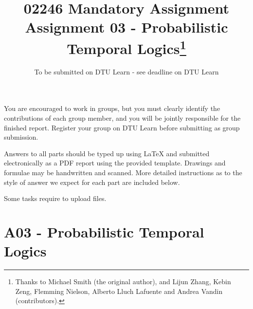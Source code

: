 \documentclass[12pt,a4paper]{article}
\title{02246 Mandatory Assignment\\
Assignment 03 - Probabilistic Temporal Logics\footnote{Thanks to Michael Smith (the original author), and Lijun Zhang, Kebin Zeng, Flemming Nielson, Alberto Lluch Lafuente and Andrea Vandin (contributors).}}
\date{To be submitted on DTU Learn - see deadline on DTU Learn}
\begin{document}
\maketitle

\noindent
You are encouraged to work in groups, 
but you must clearly identify the contributions of each group member, and you will be jointly responsible for the finished report. Register your group on DTU Learn before submitting as group submission. 
\par
Answers to all parts should be typed up using LaTeX and submitted electronically as a PDF report using the provided template. Drawings and formulae may be handwritten
and scanned. More detailed instructions as to the style of answer we expect for each part are included below.
\par
Some tasks require to upload files. %


\newif\ifwithanswers
\withanswerstrue


\pagebreak

\section*{A03 - Probabilistic Temporal Logics}
\end{document}
